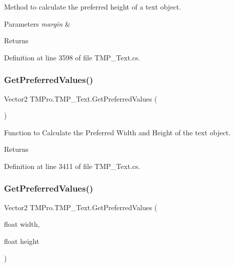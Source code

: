 Method to calculate the preferred height of a text object. 


\begin{DoxyParams}{Parameters}
{\em margin} & \\
\hline
\end{DoxyParams}
\begin{DoxyReturn}{Returns}

\end{DoxyReturn}


Definition at line 3598 of file T\+M\+P\+\_\+\+Text.\+cs.

\mbox{\label{class_t_m_pro_1_1_t_m_p___text_a9d3dbcb6ccf3ef97454b5ec89725eccb}} 
\subsubsection{\texorpdfstring{GetPreferredValues()}{GetPreferredValues()}\hspace{0.1cm}{\footnotesize\ttfamily [1/4]}}
{\footnotesize\ttfamily Vector2 T\+M\+Pro.\+T\+M\+P\+\_\+\+Text.\+Get\+Preferred\+Values (\begin{DoxyParamCaption}{ }\end{DoxyParamCaption})}



Function to Calculate the Preferred Width and Height of the text object. 

\begin{DoxyReturn}{Returns}

\end{DoxyReturn}


Definition at line 3411 of file T\+M\+P\+\_\+\+Text.\+cs.

\mbox{\label{class_t_m_pro_1_1_t_m_p___text_a214f876e2c3bbcfde711d95e4c79b821}} 
\subsubsection{\texorpdfstring{GetPreferredValues()}{GetPreferredValues()}\hspace{0.1cm}{\footnotesize\ttfamily [2/4]}}
{\footnotesize\ttfamily Vector2 T\+M\+Pro.\+T\+M\+P\+\_\+\+Text.\+Get\+Preferred\+Values (\begin{DoxyParamCaption}\item[{float}]{width,  }\item[{float}]{height }\end{DoxyParamCaption})}




